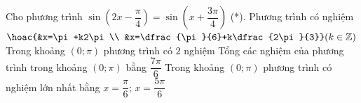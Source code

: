 \begin{ex}%
	Cho phương trình $\sin \left(2  x-\dfrac{\pi}{4}\right)=\sin \left(x+\dfrac{3 \pi}{4}\right)$ (*).
	 \choiceTF
		{\True Phương trình có nghiệm $\hoac{&x=\pi+k2\pi  \\ &x=\dfrac{\pi}{6}+k\dfrac{2\pi}{3}} (k\in \mathbb{Z})$}
		{\True Trong khoảng  $(0;\pi)$ phương trình có $2$ nghiệm}
		{Tổng  các nghiệm của phương trình trong khoảng $(0;\pi)$ bằng $\dfrac{7\pi}{6}$}
		{\True Trong khoảng $(0;\pi)$ phương trình có nghiệm  lớn nhất bằng $x=\dfrac{\pi}{6}$; $x=\dfrac{5 \pi}{6}$}
\end{ex}


